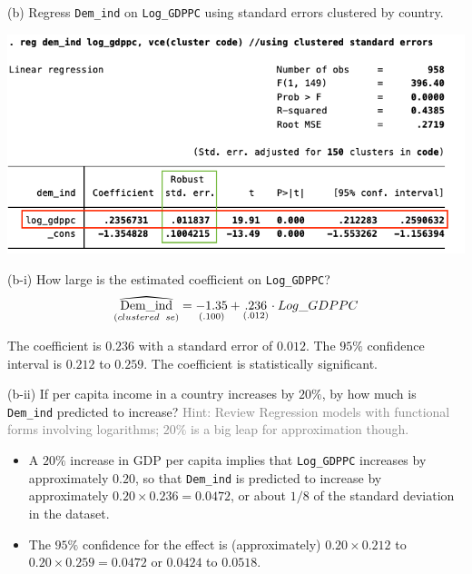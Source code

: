 \documentclass[
  10pt,
  ignorenonframetext,
]{beamer}
\providecommand{\tightlist}{%
  \setlength{\itemsep}{0pt}\setlength{\parskip}{0pt}}
\newcommand\reallywidehat[1]{%
\savestack{\tmpbox}{\stretchto{%
  \scaleto{%
    \scalerel*[\widthof{\ensuremath{#1}}]{\kern.1pt\mathchar"0362\kern.1pt}%
    {\rule{0ex}{\textheight}}%
  }{\textheight}%
}{2.4ex}}%
\stackon[-6.9pt]{#1}{\tmpbox}%
}
\begin{document}
\begin{frame}{(b) Regress \texttt{Dem\_ind} on \texttt{Log\_GDPPC} using
standard errors clustered by country.}
\protect\hypertarget{b-regress-dem_ind-on-log_gdppc-using-standard-errors-clustered-by-country.}{}
\begin{flushleft}\includegraphics[width=0.9\linewidth]{pictures/Ex2-pooledsimplewithclustering} \end{flushleft}
\end{frame}

\begin{frame}{(b-i) How large is the estimated coefficient on
\texttt{Log\_GDPPC}?}
\protect\hypertarget{b-i-how-large-is-the-estimated-coefficient-on-log_gdppc}{}
\[
\underset{(clustered \enspace se)}{\reallywidehat{Dem\_ind}} = \underset{(.100)}{-1.35} +  \underset{(.012)}{.236} \cdot Log\_GDPPC 
\]

The coefficient is \(0.236\) with a standard error of \(0.012\). The
\(95\%\) confidence interval is \(0.212\) to \(0.259\). The coefficient
is statistically significant.
\end{frame}

\begin{frame}[fragile]{(b-ii) If per capita income in a country
increases by \(20\%\), by how much is \texttt{Dem\_ind} predicted to
increase?}
\protect\hypertarget{b-ii-if-per-capita-income-in-a-country-increases-by-20-by-how-much-is-dem_ind-predicted-to-increase}{}
\footnotesize \textcolor{gray}{Hint: Review Regression models with functional forms involving logarithms; $20\%$ is a big leap for approximation though.}
\normalsize

\vspace{0.8mm}

\begin{itemize}
\tightlist
\item
  A \(20\%\) increase in GDP per capita implies that \texttt{Log\_GDPPC}
  increases by approximately \(0.20\), so that \texttt{Dem\_ind} is
  predicted to increase by approximately \(0.20\times0.236 = 0.0472\),
  or about \(1/8\) of the standard deviation in the dataset.
\end{itemize}

\vspace{0.8mm}

\begin{itemize}
\tightlist
\item
  The \(95\%\) confidence for the effect is (approximately)
  \(0.20\times0.212\) to \(0.20\times0.259 = 0.0472\) or \(0.0424\) to
  \(0.0518\).
\end{itemize}
\end{frame}
\end{document}
